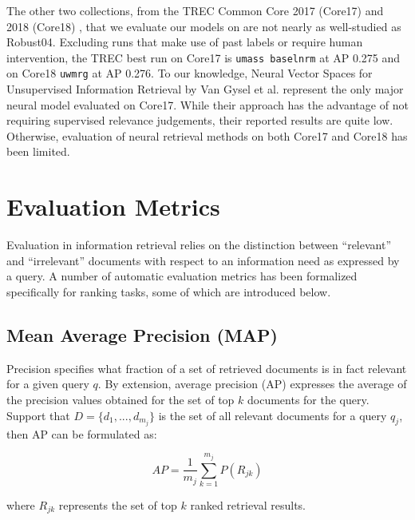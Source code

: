 The other two collections, from the TREC Common Core 2017 (Core17) \cite{allan2017trec} and 2018 (Core18) \cite{}, that we evaluate our models on are not nearly as well-studied as Robust04.
Excluding runs that make use of past labels or require human intervention, the TREC best run on Core17 is \texttt{umass baselnrm} at AP 0.275 and on Core18 \texttt{uwmrg} at AP 0.276.
To our knowledge, Neural Vector Spaces for Unsupervised Information Retrieval by Van Gysel et al. \cite{Gysel:2018:NVS:3211967.3196826} represent the only major neural model evaluated on Core17.
While their approach has the advantage of not requiring supervised relevance judgements, their reported results are quite low.
Otherwise, evaluation of neural retrieval methods on both Core17 and Core18 has been limited.

\section{Evaluation Metrics}

Evaluation in information retrieval relies on the distinction between ``relevant'' and ``irrelevant'' documents with respect to an information need as expressed by a query.
A number of automatic evaluation metrics has been formalized specifically for ranking tasks, some of which are introduced below.


\subsection{Mean Average Precision (MAP)}

Precision specifies what fraction of a set of retrieved documents is in fact relevant for a given query $ q $.
By extension, average precision (AP) expresses the average of the precision values obtained for the set of top $ k $ documents for the query.
Support that $ D = \{d_1, ..., d_{m_j}\} $ is the set of all relevant documents for a query $ q_j $, then AP can be formulated as:

\begin{equation}
AP = \frac{1}{m_j} \sum^{m_j} _{k = 1} P(R_{jk})
\end{equation}

where $ R_{jk} $ represents the set of top $ k $ ranked retrieval results.

